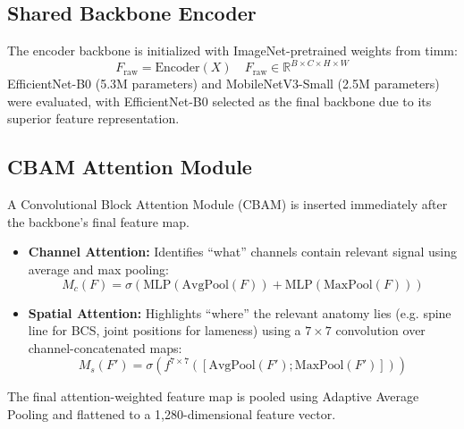 \subsection{Shared Backbone Encoder}
The encoder backbone is initialized with ImageNet-pretrained weights from timm:
\begin{equation}
    F_{\text{raw}} = \text{Encoder}(X) \quad F_{\text{raw}} \in \mathbb{R}^{B \times C \times H \times W}
\end{equation}
EfficientNet-B0 \cite{efficientnet2019} (5.3M parameters) and MobileNetV3-Small \cite{mobilenetv3} (2.5M parameters) were evaluated, with EfficientNet-B0 selected as the final backbone due to its superior feature representation.

\subsection{CBAM Attention Module}
A Convolutional Block Attention Module (CBAM) \cite{cbam2018} is inserted immediately after the backbone's final feature map.
\begin{itemize}
    \item \textbf{Channel Attention:} Identifies ``what'' channels contain relevant signal using average and max pooling:
    \begin{equation}
        M_c(F) = \sigma(\text{MLP}(\text{AvgPool}(F)) + \text{MLP}(\text{MaxPool}(F)))
    \end{equation}
    \item \textbf{Spatial Attention:} Highlights ``where'' the relevant anatomy lies (e.g. spine line for BCS, joint positions for lameness) using a $7 \times 7$ convolution over channel-concatenated maps:
    \begin{equation}
        M_s(F') = \sigma(f^{7 \times 7}([\text{AvgPool}(F'); \text{MaxPool}(F')]))
    \end{equation}
\end{itemize}
The final attention-weighted feature map is pooled using Adaptive Average Pooling and flattened to a 1,280-dimensional feature vector.

